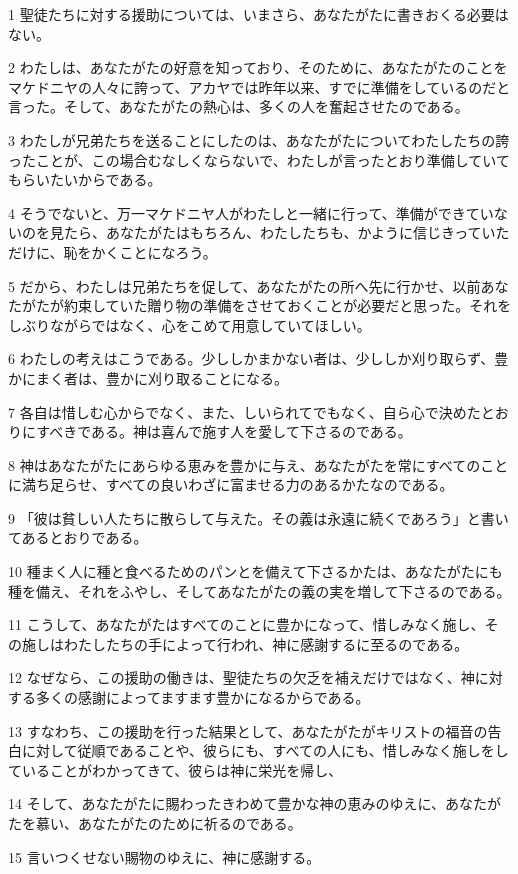 \par 1 聖徒たちに対する援助については、いまさら、あなたがたに書きおくる必要はない。
\par 2 わたしは、あなたがたの好意を知っており、そのために、あなたがたのことをマケドニヤの人々に誇って、アカヤでは昨年以来、すでに準備をしているのだと言った。そして、あなたがたの熱心は、多くの人を奮起させたのである。
\par 3 わたしが兄弟たちを送ることにしたのは、あなたがたについてわたしたちの誇ったことが、この場合むなしくならないで、わたしが言ったとおり準備していてもらいたいからである。
\par 4 そうでないと、万一マケドニヤ人がわたしと一緒に行って、準備ができていないのを見たら、あなたがたはもちろん、わたしたちも、かように信じきっていただけに、恥をかくことになろう。
\par 5 だから、わたしは兄弟たちを促して、あなたがたの所へ先に行かせ、以前あなたがたが約束していた贈り物の準備をさせておくことが必要だと思った。それをしぶりながらではなく、心をこめて用意していてほしい。
\par 6 わたしの考えはこうである。少ししかまかない者は、少ししか刈り取らず、豊かにまく者は、豊かに刈り取ることになる。
\par 7 各自は惜しむ心からでなく、また、しいられてでもなく、自ら心で決めたとおりにすべきである。神は喜んで施す人を愛して下さるのである。
\par 8 神はあなたがたにあらゆる恵みを豊かに与え、あなたがたを常にすべてのことに満ち足らせ、すべての良いわざに富ませる力のあるかたなのである。
\par 9 「彼は貧しい人たちに散らして与えた。その義は永遠に続くであろう」と書いてあるとおりである。
\par 10 種まく人に種と食べるためのパンとを備えて下さるかたは、あなたがたにも種を備え、それをふやし、そしてあなたがたの義の実を増して下さるのである。
\par 11 こうして、あなたがたはすべてのことに豊かになって、惜しみなく施し、その施しはわたしたちの手によって行われ、神に感謝するに至るのである。
\par 12 なぜなら、この援助の働きは、聖徒たちの欠乏を補えだけではなく、神に対する多くの感謝によってますます豊かになるからである。
\par 13 すなわち、この援助を行った結果として、あなたがたがキリストの福音の告白に対して従順であることや、彼らにも、すべての人にも、惜しみなく施しをしていることがわかってきて、彼らは神に栄光を帰し、
\par 14 そして、あなたがたに賜わったきわめて豊かな神の恵みのゆえに、あなたがたを慕い、あなたがたのために祈るのである。
\par 15 言いつくせない賜物のゆえに、神に感謝する。

